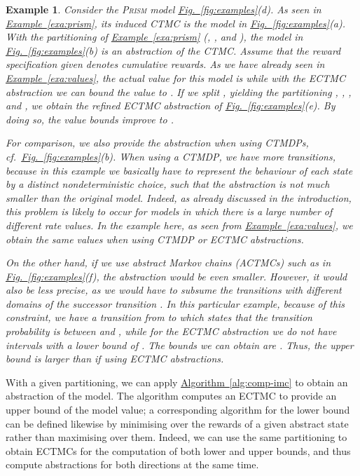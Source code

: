 \documentclass[10pt,twocolumn]{article}
\newtheorem{example}{Example}
\newcommand{\PRISM}{\textsc{Prism}\xspace}
\newcommand{\reffig}[1]{\texorpdfstring{\hyperref[fig:#1]{Fig.~\ref*{fig:#1}}}{Fig.~\ref*{fig:#1}}}
\newcommand{\refexa}[1]{\texorpdfstring{\hyperref[exa:#1]{Example~\ref*{exa:#1}}}{Example~\ref*{exa:#1}}}
\newcommand{\refalg}[1]{\texorpdfstring{\hyperref[alg:#1]{Algorithm~\ref*{alg:#1}}}{Algorithm~\ref*{alg:#1}}}
\begin{document}
\begin{example}
  \label{exa:abstraction}
Consider the \PRISM model \reffig{examples}(d).
  As seen in \refexa{prism}, its induced CTMC is the model in \reffig{examples}(a).
  With the partitioning of \refexa{prism} (, , 
  and ), the model in \reffig{examples}(b) is an abstraction of the CTMC.
  Assume that the reward specification given denotes cumulative rewards.
  As we have already seen in \refexa{values}, the actual value for this model is 
   while with the ECTMC abstraction we can bound the value to .
  If we split , yielding the partitioning
  , , , 
  and , we obtain the refined ECTMC abstraction of \reffig{examples}(e).
  By doing so, the value bounds improve to .

  For comparison, we also provide the abstraction when using CTMDPs, cf.\ \reffig{examples}(b).
  When using a CTMDP, we have more transitions, because in this example we basically 
  have to represent the behaviour of each state by a distinct nondeterministic choice, 
  such that the abstraction is not much smaller than the original model.
  Indeed, as already discussed in the introduction, this problem is likely to occur 
  for models in which there is a large number of different rate values.
  In the example here, as seen from \refexa{values}, we obtain the same values 
  when using CTMDP or ECTMC abstractions.

  On the other hand, if we use abstract Markov chains (ACTMCs) \cite{KatoenKLW07} such as 
  in \reffig{examples}(f), the abstraction would be even smaller.
  However, it would also be less precise, as we would have to subsume the transitions with different domains of the successor 
  transition .
  In this particular example, because of this constraint, we have a transition from  to  which states 
  that the transition probability is between  and , while for the ECTMC abstraction we do not 
  have intervals with a lower bound of .
  The bounds we can obtain are .
  Thus, the upper bound is larger than if using ECTMC abstractions.
\end{example}

With a given partitioning, we can apply \refalg{comp-imc} to obtain an
abstraction of the model. The algorithm computes an ECTMC to provide
an upper bound of the model value; a corresponding algorithm for the
lower bound can be defined likewise by minimising over the rewards of a given abstract state rather than maximising over them.
Indeed, we can use the same partitioning to obtain ECTMCs for the computation of both lower and upper bounds,
and thus compute abstractions for both directions at the same time.
\end{document}

